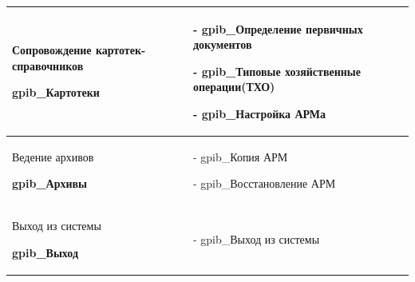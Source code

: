 \begin{table}[!htb]
\begin{tabular}{|p{8cm}|p{8cm}|}

Сопровождение картотек-справочников \par
\hspace{0pt} \par
\textbf{gpib\_Картотеки}
&
- gpib\_Определение первичных документов \par
- gpib\_Типовые хозяйственные операции(ТХО) \par
- gpib\_Настройка АРМа
\\ \hline


Ведение архивов \par
\hspace{0pt} \par
\textbf{gpib\_Архивы}
&
- gpib\_Копия АРМ \par
- gpib\_Восстановление АРМ
\\ \hline


Выход из системы \par
\hspace{0pt} \par
\textbf{gpib\_Выход}
&
- gpib\_Выход из системы
\\ \hline


    \end{tabular}
\end{table}

\newpage
